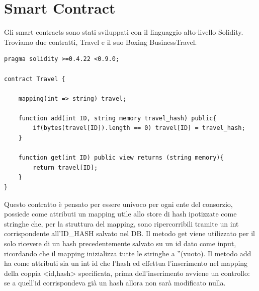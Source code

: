 \documentclass[11pt,a4paper,titlepage]{report}
\begin{document}
\section{Smart Contract}
Gli smart contracts sono stati sviluppati con il linguaggio alto-livello Solidity. Troviamo due contratti, Travel e il suo Boxing BusinessTravel.
\begin{lstlisting}[language=Solidity]
pragma solidity >=0.4.22 <0.9.0;

contract Travel {

    mapping(int => string) travel;

    function add(int ID, string memory travel_hash) public{
        if(bytes(travel[ID]).length == 0) travel[ID] = travel_hash;
    }

    function get(int ID) public view returns (string memory){
        return travel[ID];
    }
}
\end{lstlisting}
Questo contratto è pensato per essere univoco per ogni ente del consorzio, possiede come attributi un mapping utile allo store di hash ipotizzate come stringhe che, per la struttura del mapping, sono ripercorribili tramite un int corrispondente all'ID\_HASH salvato nel DB. Il metodo get viene utilizzato per il solo ricevere di un hash precedentemente salvato su un id dato come input, ricordando che il mapping inizializza tutte le stringhe a ''(vuoto). Il metodo add ha come attributi sia un int id che l'hash ed effettua l'inserimento nel mapping della coppia <id,hash> specificata, prima dell'inserimento avviene un controllo: se a quell'id corrispondeva già un hash allora non sarà modificato nulla.
\end{document}
